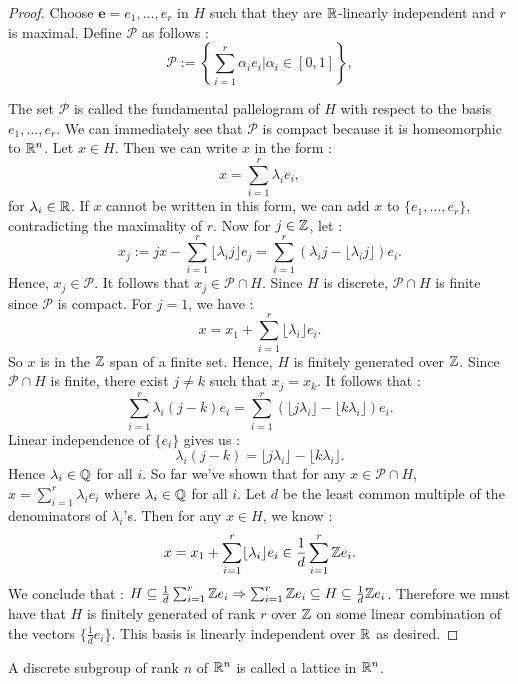 \begin{proof}
  Choose $\mathbf{e}=e_1,\ldots, e_r$ in $H$ such that they are $\mathbb{R}$-linearly independent and $r$ is maximal. Define $\mathscr{P}$ as follows :
  \[\mathscr{P} := \left\{\sum_{i=1}^r \alpha_i e_i | \alpha_i \in [0,1]\right\},\]

  The set $\mathscr{P}$ is called the fundamental pallelogram of $H$ with respect to the basis $e_1, \ldots, e_r$. We can immediately see that $\mathscr{P}$ is compact because it is homeomorphic to $\mathbb{R}^n$.
  Let $x\in H$. Then we can write $x$ in the form :
  \[x = \sum_{i=1}^r \lambda_i e_i,\]
  for $\lambda_i \in \mathbb{R}$. If $x$ cannot be written in this form, we can add $x$ to $\{e_1,\ldots, e_r\}$, contradicting the maximality of $r$.
  Now for $j\in \mathbb{Z}$, let :
  \[x_j := jx - \sum_{i=1}^r \lfloor \lambda_i j\rfloor e_j = \sum_{i=1}^r (\lambda_i j - \lfloor\lambda_i j\rfloor)e_i \tag{$j\in \Z$}.\]
  Hence, $x_j\in \mathscr{P}$. It follows that $x_j \in \mathscr{P}\cap H$.
  Since $H$ is discrete, $\mathscr{P}\cap H$ is finite since $\mathscr{P}$ is compact. For $j=1$, we have :
  \[x = x_1 + \sum_{i=1}^r \lfloor \lambda_i \rfloor e_i.\]
  So $x$ is in the $\mathbb{Z}$ span of a finite set. Hence, $H$ is finitely generated over $\mathbb{Z}$. Since $\mathscr{P}\cap H$ is finite, there exist $j\neq k$ such that $x_j = x_k$. It follows that :
  \[\sum_{i=1}^r \lambda_i (j-k)e_i = \sum_{i=1}^r (\lfloor j\lambda_i\rfloor - \lfloor k\lambda_i\rfloor)e_i.\]
  Linear independence of $\{e_i\}$ gives us :
  \[\lambda_i (j-k)=\lfloor j\lambda_i\rfloor - \lfloor k\lambda_i\rfloor.\]
  Hence $\lambda_i \in \mathbb{Q}$ for all $i$. So far we've shown that for any $x\in \mathscr{P}\cap H$, $x=\sum_{i=1}^r \lambda_i e_i$ where $\lambda_i\in \mathbb{Q}$ for all $i$. Let $d$ be the least common multiple of the denominators of $\lambda_i$'s. Then for any $x\in H$, we know :
  \[x = x_1+\sum_{i=1}^r \lfloor \lambda_i \rfloor e_i \in \frac{1}{d}\sum_{i=1}^r \mathbb{Z} e_i.\] We conclude that :
  $H \subseteq \frac{1}{d}\sum_{i=1}^r \mathbb{Z} e_i \Rightarrow \sum_{i=1}^r \mathbb{Z} e_i \subseteq H \subseteq \frac{1}{d}\mathbb{Z} e_i$. Therefore we must have that $H$ is finitely generated of rank $r$ over $\mathbb{Z}$ on some linear combination of the vectors $\{\frac{1}{d}e_i\}$. This basis is linearly independent over $\mathbb{R}$ as desired.
\end{proof}

\begin{definition}[Lattice]
  A discrete subgroup of rank $n$ of $\mathbb{R}^n$ is called a lattice in $\mathbb{R}^n$.
\end{definition}

